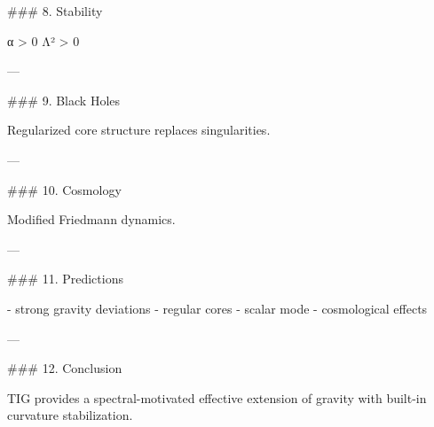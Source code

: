 ### 8. Stability

α > 0  
Λ² > 0  

---

### 9. Black Holes

Regularized core structure replaces singularities.

---

### 10. Cosmology

Modified Friedmann dynamics.

---

### 11. Predictions

- strong gravity deviations  
- regular cores  
- scalar mode  
- cosmological effects  

---

### 12. Conclusion

TIG provides a spectral-motivated effective extension of gravity with built-in curvature stabilization.
